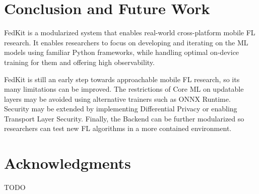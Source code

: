 \documentclass[letterpaper]{article} %
\begin{document}
\section{Conclusion and Future Work}

FedKit is a modularized system that enables real-world cross-platform
mobile FL research.
It enables researchers to focus on developing and iterating on the ML models
using familiar Python frameworks,
while handling optimal on-device training for them and
offering high observability.

FedKit is still an early step towards approachable mobile FL research,
so its many limitations can be improved.
The restrictions of Core ML on updatable layers may be avoided
using alternative trainers such as ONNX Runtime.
Security may be extended by implementing Differential Privacy or
enabling Transport Layer Security.
Finally, the Backend can be further modularized so researchers can
test new FL algorithms in a more contained environment.

\appendix

\section*{Acknowledgments}
TODO

\bigskip


\end{document}
